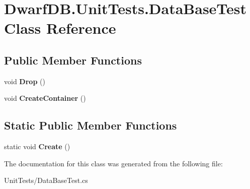 \hypertarget{class_dwarf_d_b_1_1_unit_tests_1_1_data_base_test}{\section{Dwarf\+D\+B.\+Unit\+Tests.\+Data\+Base\+Test Class Reference}
\label{class_dwarf_d_b_1_1_unit_tests_1_1_data_base_test}
}
\subsection*{Public Member Functions}
\begin{DoxyCompactItemize}
\item 
\hypertarget{class_dwarf_d_b_1_1_unit_tests_1_1_data_base_test_a3dccc953d20e97fa83507fa9958c20c7}{void {\bfseries Drop} ()}\label{class_dwarf_d_b_1_1_unit_tests_1_1_data_base_test_a3dccc953d20e97fa83507fa9958c20c7}

\item 
\hypertarget{class_dwarf_d_b_1_1_unit_tests_1_1_data_base_test_a6bd7caf149d6611d8dca8c1013cc1612}{void {\bfseries Create\+Container} ()}\label{class_dwarf_d_b_1_1_unit_tests_1_1_data_base_test_a6bd7caf149d6611d8dca8c1013cc1612}

\end{DoxyCompactItemize}
\subsection*{Static Public Member Functions}
\begin{DoxyCompactItemize}
\item 
\hypertarget{class_dwarf_d_b_1_1_unit_tests_1_1_data_base_test_a770bbf91e34112392e2385ea183ca7ee}{static void {\bfseries Create} ()}\label{class_dwarf_d_b_1_1_unit_tests_1_1_data_base_test_a770bbf91e34112392e2385ea183ca7ee}

\end{DoxyCompactItemize}


The documentation for this class was generated from the following file\+:\begin{DoxyCompactItemize}
\item 
Unit\+Tests/Data\+Base\+Test.\+cs\end{DoxyCompactItemize}
